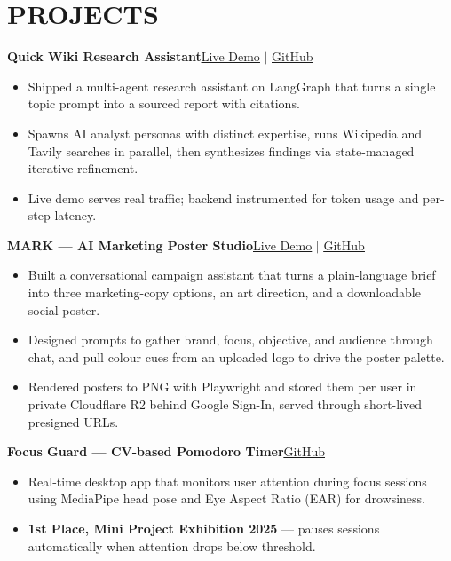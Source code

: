 \documentclass[10pt,letterpaper]{article}
\newcommand{\lnk}[2]{\href{#2}{\underline{#1}}}          %
\newenvironment{bul}
  {\begin{itemize}[leftmargin=1.15em,labelsep=0.4em,label=\textbullet,
                   itemsep=0pt,topsep=1pt,parsep=0pt,partopsep=0pt]}
  {\end{itemize}}
\newcommand{\projhead}[3]{%
  \par\vspace{2pt}\noindent\textbf{#1}\hspace{0.45em}{\small\itshape\,$\vert$\,#2}\hfill{\small #3}\par\nopagebreak}
\begin{document}
\section{PROJECTS}

\projhead{Quick Wiki Research Assistant}{LangGraph, LangChain, FastAPI, Tavily, Python}
  {\lnk{Live Demo}{https://sahil.page/projects/wikipedia-assistant} $\vert$ \lnk{GitHub}{https://github.com/sahil007-ai/quick-wiki}}
\begin{bul}
  \item Shipped a multi-agent research assistant on LangGraph that turns a single topic prompt into a sourced report with citations.
  \item Spawns AI analyst personas with distinct expertise, runs Wikipedia and Tavily searches in parallel, then synthesizes findings via state-managed iterative refinement.
  \item Live demo serves real traffic; backend instrumented for token usage and per-step latency.
\end{bul}

\projhead{MARK --- AI Marketing Poster Studio}{Python, Flask, OpenRouter, Playwright}
  {\lnk{Live Demo}{https://mark-amber-alpha.vercel.app/} $\vert$ \lnk{GitHub}{https://github.com/sahil007-ai/mark}}
\begin{bul}
  \item Built a conversational campaign assistant that turns a plain-language brief into three marketing-copy options, an art direction, and a downloadable social poster.
  \item Designed prompts to gather brand, focus, objective, and audience through chat, and pull colour cues from an uploaded logo to drive the poster palette.
  \item Rendered posters to PNG with Playwright and stored them per user in private Cloudflare R2 behind Google Sign-In, served through short-lived presigned URLs.
\end{bul}

\projhead{Focus Guard --- CV-based Pomodoro Timer}{Python, OpenCV, MediaPipe}
  {\lnk{GitHub}{https://github.com/sahil007-ai/cv-focus-guard-ai-pomodoro}}
\begin{bul}
  \item Real-time desktop app that monitors user attention during focus sessions using MediaPipe head pose and Eye Aspect Ratio (EAR) for drowsiness.
  \item \textbf{1st Place, Mini Project Exhibition 2025} --- pauses sessions automatically when attention drops below threshold.
\end{bul}
\end{document}
